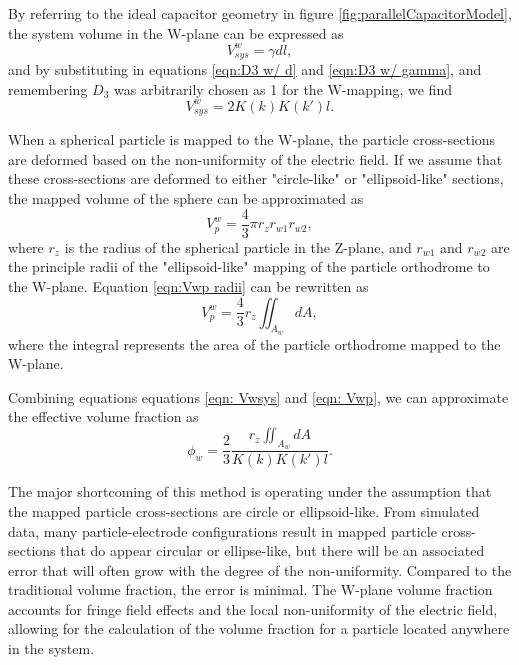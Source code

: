 \par By referring to the ideal capacitor geometry in figure \ref{fig:parallelCapacitorModel}, the system volume in the W-plane can be expressed as 
\begin{equation}
    V^w_{sys} = \gamma d l,    
\end{equation}
\noindent and by substituting in equations \ref{eqn:D3 w/ d} and \ref{eqn:D3 w/ gamma}, and remembering $D_3$ was arbitrarily chosen as 1 for the W-mapping, we find
\begin{equation}
    V^w_{sys} = 2K(k)K(k')l.
    \label{eqn: Vwsys}
\end{equation}
\par When a spherical particle is mapped to the W-plane, the particle cross-sections are deformed based on the non-uniformity of the electric field. If we assume that these cross-sections are deformed to either "circle-like" or "ellipsoid-like" sections, the mapped volume of the sphere can be approximated as 
\begin{equation}
    V^w_p = \frac{4}{3}\pi r_z r_{w1} r_{w2},
    \label{eqn:Vwp radii}
\end{equation}
\noindent where $r_z$ is the radius of the spherical particle in the Z-plane, and $r_{w1}$ and $r_{w2}$ are the principle radii of the "ellipsoid-like" mapping of the particle orthodrome to the W-plane. Equation \ref{eqn:Vwp radii} can be rewritten as 
\begin{equation}
    V^w_p = \frac{4}{3} r_z \iint_{A_w} dA,
    \label{eqn: Vwp}
\end{equation}
\noindent where the integral represents the area of the particle orthodrome mapped to the W-plane. 

\par Combining equations equations \ref{eqn: Vwsys} and \ref{eqn: Vwp}, we can approximate the effective volume fraction as
\begin{equation}
    \phi_w = \frac{2}{3} \frac{r_z \iint_{A_w} dA}{K(k)K(k')l}.
\end{equation}

\par The major shortcoming of this method is operating under the assumption that the mapped particle cross-sections are circle or ellipsoid-like. From simulated data, many particle-electrode configurations result in mapped particle cross-sections that do appear circular or ellipse-like, but there will be an associated error that will often grow with the degree of the non-uniformity. Compared to the traditional volume fraction, the error is minimal. The W-plane volume fraction accounts for fringe field effects and the local non-uniformity of the electric field, allowing for the calculation of the volume fraction for a particle located anywhere in the system. 

